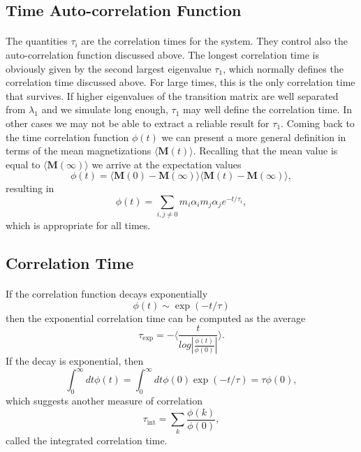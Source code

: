 \documentclass[%
oneside,                 %
final,                   %
10pt]{article}
\begin{document}
\subsection*{Time Auto-correlation Function}

\paragraph{}

The quantities $\tau_i$ are the correlation times for the system. They control also the auto-correlation function 
discussed above.  The longest correlation time is obviously given by the second largest
eigenvalue $\tau_1$, which normally defines the correlation time discussed above. For large times, this is the 
only correlation time that survives. If higher eigenvalues of the transition matrix are well separated from 
$\lambda_1$ and we simulate long enough,  $\tau_1$ may well define the correlation time. 
In other cases we may not be able to extract a reliable result for $\tau_1$. 
Coming back to the time correlation function $\phi(t)$ we can present a more general definition in terms
of the mean magnetizations $ \langle \mathbf{M}(t) \rangle$. Recalling that the mean value is equal 
to $ \langle \mathbf{M}(\infty) \rangle$ we arrive at the expectation values
\[
\phi(t) =\langle \mathbf{M}(0)-\mathbf{M}(\infty)\rangle \langle \mathbf{M}(t)-\mathbf{M}(\infty)\rangle,
\]
resulting in
\[
\phi(t) =\sum_{i,j\ne 0}m_i\alpha_im_j\alpha_je^{-t/\tau_i},
\]
which is appropriate for all times.



\subsection*{Correlation Time}

\paragraph{}

If the correlation function decays exponentially
\[ \phi (t) \sim \exp{(-t/\tau)}\]
then the exponential correlation time can be computed as the average
\[   \tau_{\mathrm{exp}}  =  -\langle  \frac{t}{log|\frac{\phi(t)}{\phi(0)}|} \rangle. \]
If the decay is exponential, then
\[  \int_0^{\infty} dt \phi(t)  = \int_0^{\infty} dt \phi(0)\exp{(-t/\tau)}  = \tau \phi(0),\] 
which  suggests another measure of correlation
\[   \tau_{\mathrm{int}} = \sum_k \frac{\phi(k)}{\phi(0)}, \]
called the integrated correlation time.
\end{document}
